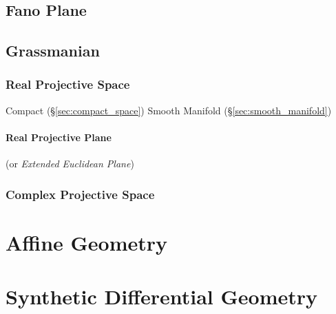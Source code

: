 \subsection{Fano Plane}\label{sec:fano_plane}

\subsection{Grassmanian}\label{sec:grassmanian}

\subsubsection{Real Projective Space}\label{sec:real_projective_space}

Compact (\S\ref{sec:compact_space}) Smooth Manifold
(\S\ref{sec:smooth_manifold})



\paragraph{Real Projective Plane}\label{sec:real_projective_plane}\hfill

(or \emph{Extended Euclidean Plane})



\subsubsection{Complex Projective Space}
\label{sec:complex_projective_space}



\section{Affine Geometry}\label{sec:affine_geometry}

\section{Synthetic Differential Geometry}
\label{sec:synthetic_differential_geometry}

